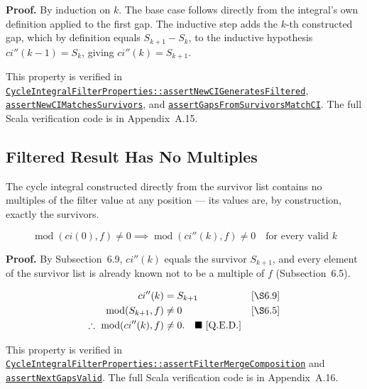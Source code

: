 \textbf{Proof.} By induction on $k$. The base case follows directly from the
integral's own definition applied to the first gap. The inductive step
adds the $k$-th constructed gap, which by definition equals
$S_{k+1} - S_k$, to the inductive hypothesis $ci''(k-1) = S_k$, giving
$ci''(k) = S_{k+1}$.

{\raggedright
This property is verified in
\href{https://github.com/thiagomata/prime-numbers/blob/integral-cycle-article-v1.0.0/src/main/scala/v1/chapter4/cycle/integral/recursive/properties/CycleIntegralFilterProperties.scala}{\texttt{CycleIntegralFilterProperties::\allowbreak assertNewCIGeneratesFiltered}},
\href{https://github.com/thiagomata/prime-numbers/blob/integral-cycle-article-v1.0.0/src/main/scala/v1/chapter4/cycle/integral/recursive/properties/CycleIntegralFilterProperties.scala}{\texttt{assertNewCIMatchesSurvivors}},
and
\href{https://github.com/thiagomata/prime-numbers/blob/integral-cycle-article-v1.0.0/src/main/scala/v1/chapter4/cycle/integral/recursive/properties/CycleIntegralFilterProperties.scala}{\texttt{assertGapsFromSurvivorsMatchCI}}.
The full Scala verification code is in Appendix~A.15.
\par}

\subsection{Filtered Result Has No Multiples}

The cycle integral constructed directly from the survivor list contains no
multiples of the filter value at any position --- its values are, by
construction, exactly the survivors.

\begin{equation*}
\operatorname{mod}(ci(0), f) \neq 0 \implies
\operatorname{mod}(ci''(k), f) \neq 0
\quad \text{for every valid } k
\end{equation*}

\textbf{Proof.} By Subsection~6.9, $ci''(k)$
equals the survivor $S_{k+1}$, and every element of the survivor list is
already known not to be a multiple of $f$
(Subsection~6.5).

\begin{equation*}
\begin{aligned}
ci''(k) &= S_{k+1} &&\text{[\S6.9]} \\
\operatorname{mod}(S_{k+1},f) &\neq 0 &&\text{[\S6.5]} \\
\therefore\ \operatorname{mod}(ci''(k),f) &\neq 0.
  \quad \blacksquare\ \text{[Q.E.D.]}
\end{aligned}
\end{equation*}

{\raggedright
This property is verified in
\href{https://github.com/thiagomata/prime-numbers/blob/integral-cycle-article-v1.0.0/src/main/scala/v1/chapter4/cycle/integral/recursive/properties/CycleIntegralFilterProperties.scala}{\texttt{CycleIntegralFilterProperties::\allowbreak assertFilterMergeComposition}}
and
\href{https://github.com/thiagomata/prime-numbers/blob/integral-cycle-article-v1.0.0/src/main/scala/v1/chapter4/cycle/integral/recursive/properties/CycleIntegralFilterProperties.scala}{\texttt{assertNextGapsValid}}.
The full Scala verification code is in Appendix~A.16.
\par}
